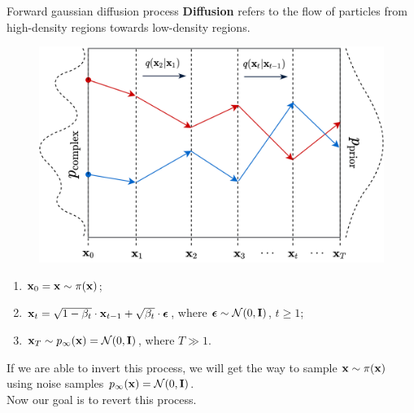 \begin{frame}{Forward gaussian diffusion process}
	\textbf{Diffusion} refers to the flow of particles from high-density regions towards low-density regions.
	\vspace{-0.2cm}
	\begin{figure}
		\includegraphics[width=0.5\linewidth]{figs/diffusion_over_time}
	\end{figure}
	\vspace{-0.6cm}
	\begin{enumerate}
		\item $\mathbf{x}_0 = \mathbf{x} \sim \pi(\mathbf{x})$;
		\item $\mathbf{x}_t = \sqrt{1 - \beta_t} \cdot \mathbf{x}_{t - 1} + \sqrt{\beta_t} \cdot \boldsymbol{\epsilon}$, where $\boldsymbol{\epsilon} \sim \mathcal{N}(0, \mathbf{I})$, $t \geq 1$;
		\item $\mathbf{x}_T \sim p_{\infty}(\mathbf{x}) = \mathcal{N}(0, \mathbf{I})$, where $T \gg 1$.
	\end{enumerate}
	If we are able to invert this process, we will get the way to sample $\mathbf{x} \sim \pi(\mathbf{x})$ using noise samples $p_{\infty}(\mathbf{x}) = \mathcal{N}(0, \mathbf{I})$. \\ 
	Now our goal is to revert this process.
\end{frame}
